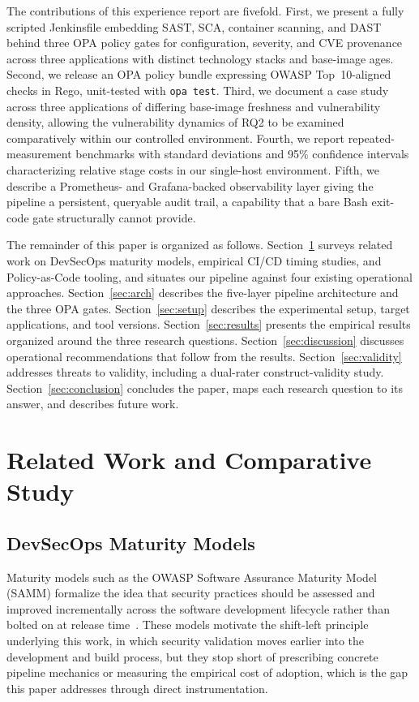 \documentclass[conference]{IEEEtran}
\begin{document}
The contributions of this experience report are fivefold. First, we present a fully scripted Jenkinsfile embedding SAST, SCA, container scanning, and DAST behind three OPA policy gates for configuration, severity, and CVE provenance across three applications with distinct technology stacks and base-image ages. Second, we release an OPA policy bundle expressing OWASP Top~10-aligned checks in Rego, unit-tested with \texttt{opa test}. Third, we document a case study across three applications of differing base-image freshness and vulnerability density, allowing the vulnerability dynamics of RQ2 to be examined comparatively within our controlled environment. Fourth, we report repeated-measurement benchmarks with standard deviations and 95\% confidence intervals characterizing relative stage costs in our single-host environment. Fifth, we describe a Prometheus- and Grafana-backed observability layer giving the pipeline a persistent, queryable audit trail, a capability that a bare Bash exit-code gate structurally cannot provide.

The remainder of this paper is organized as follows. Section~\ref{sec:related} surveys related work on DevSecOps maturity models, empirical CI/CD timing studies, and Policy-as-Code tooling, and situates our pipeline against four existing operational approaches. Section~\ref{sec:arch} describes the five-layer pipeline architecture and the three OPA gates. Section~\ref{sec:setup} describes the experimental setup, target applications, and tool versions. Section~\ref{sec:results} presents the empirical results organized around the three research questions. Section~\ref{sec:discussion} discusses operational recommendations that follow from the results. Section~\ref{sec:validity} addresses threats to validity, including a dual-rater construct-validity study. Section~\ref{sec:conclusion} concludes the paper, maps each research question to its answer, and describes future work.

\section{Related Work and Comparative Study}
\label{sec:related}

\subsection{DevSecOps Maturity Models}
Maturity models such as the OWASP Software Assurance Maturity Model (SAMM) formalize the idea that security practices should be assessed and improved incrementally across the software development lifecycle rather than bolted on at release time~\cite{ref1,ref11}. These models motivate the shift-left principle underlying this work, in which security validation moves earlier into the development and build process, but they stop short of prescribing concrete pipeline mechanics or measuring the empirical cost of adoption, which is the gap this paper addresses through direct instrumentation.
\end{document}

